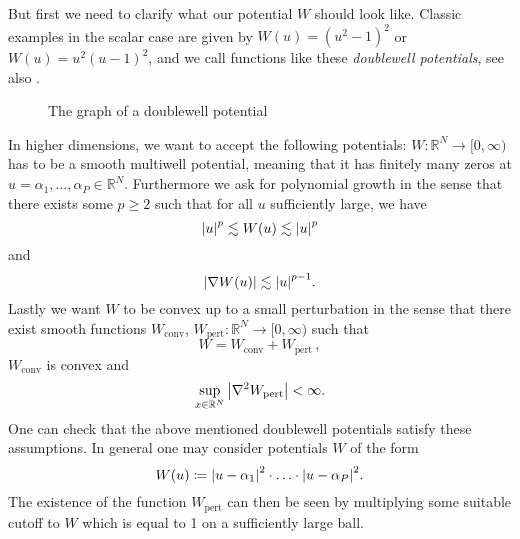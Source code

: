 But first we need to clarify what our potential $ W $ should look like. Classic 
examples in the scalar case are given by $ W ( u ) = \left( u^{ 2 } - 1 
\right)^{ 2 } $ or $ W( u ) = u^{ 2 } ( u - 1 )^{ 2 } $, and we call functions 
like these \emph{doublewell potentials}, see also 
.

\begin{figure}[ht]
	\centering
	\caption{The graph of a doublewell potential}
	\label{graph_of_doublewell_potential}
\end{figure}

In higher dimensions, we want to accept the following potentials: $ W \colon 
\mathbb{ R }^{ N } \to [0, \infty ) $ has to be a smooth multiwell potential, 
meaning that it has finitely many zeros at $ u = \alpha_{ 1 }, \dotsc , 
\alpha_{ P } \in \mathbb{ R }^{ N } $. Furthermore we ask for polynomial growth 
in the sense that there exists some $ p \geq 2 $ such that for all $ u $ 
sufficiently large, we have
\begin{equation}
	\label{polynomial_growth}
	\abs{ u }^{ p } \lesssim W(u) \lesssim \abs{ u }^{ p }
\end{equation}
and
\begin{equation}
	\label{polynomial_growth_derivative}
	\abs{ \nabla W ( u ) } \lesssim \abs{ u }^{ p -1 }.
\end{equation}
Lastly we want $ W $ to be convex up to a small perturbation in the sense that 
there exist smooth functions 
$ W_{ \mathrm{conv} }$, $ W_{ \mathrm{pert} } \colon \mathbb{ R }^{ N } \to [ 0 , \infty ) $ such that
\begin{equation}
	\label{decomposition_of_w}
	W = W_{ \mathrm{conv}} + W_{ \mathrm{pert}}\, ,
\end{equation}
$ W_{ \mathrm{conv} } $ is convex and
\begin{equation}
	\label{perturbation bound}
	\sup_{ x \in \mathbb{ R }^{ N } }
	\abs{ \nabla^{ 2 } W_{ \mathrm{pert} } } < \infty.
\end{equation}
One can check that the above mentioned doublewell potentials satisfy these 
assumptions. In general one may consider potentials $ W $ of the form
\begin{equation*}
	W ( u ) \coloneqq
	\abs{ u - \alpha_{ 1 } }^{ 2 } 
	\cdot
	\dotsc
	\cdot
	\abs{ u - \alpha_{ P } }^{ 2 }.
\end{equation*} 
The existence of the function $ W_{ \mathrm{pert} } $ can then be seen by 
multiplying some suitable cutoff to $ W 
$ which is equal to 1 on a sufficiently large ball.

